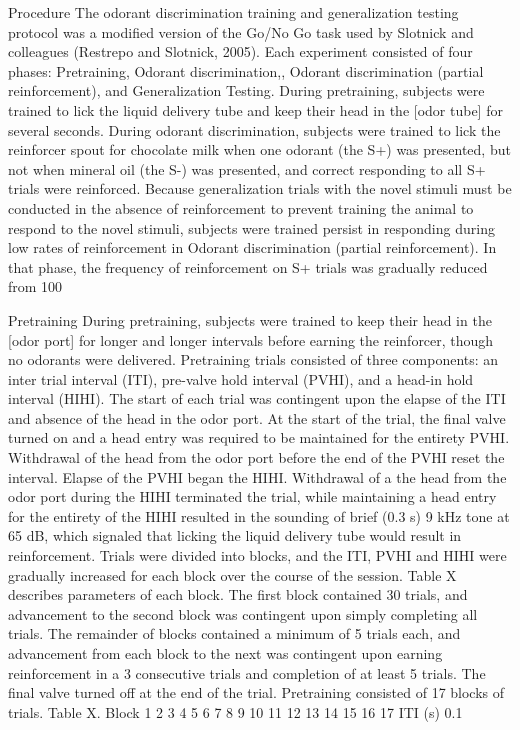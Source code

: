 Procedure
The odorant discrimination training and generalization testing protocol was a modified version of the Go/No Go task used by Slotnick and colleagues (Restrepo and Slotnick, 2005). Each experiment consisted of four phases: Pretraining, Odorant discrimination,, Odorant discrimination (partial reinforcement),  and Generalization Testing. During pretraining, subjects were trained to lick the liquid delivery tube and keep their head in the [odor tube] for several seconds. During odorant discrimination, subjects were trained to lick the reinforcer spout for chocolate milk when one odorant (the S+) was presented, but not when mineral oil (the S-) was presented, and correct responding to all S+ trials were reinforced. Because generalization trials with the novel stimuli must be conducted in the absence of reinforcement to prevent training the animal to respond to the novel stimuli, subjects were trained persist in responding during low rates of reinforcement in Odorant discrimination (partial reinforcement). In that phase, the frequency of reinforcement on S+ trials was gradually reduced from 100%

Pretraining
During pretraining, subjects were trained to keep their head in the [odor port] for longer and longer intervals before earning the reinforcer, though no odorants were delivered. Pretraining trials consisted of three components: an inter trial interval (ITI), pre-valve hold interval (PVHI), and a head-in hold interval (HIHI). The start of each trial was contingent upon the elapse of the ITI and absence of the head in the odor port. At the start of the trial, the final valve turned on and a head entry was required to be maintained for the entirety PVHI. Withdrawal of the head from the odor port before the end of the PVHI reset the interval. Elapse of the PVHI began the HIHI. Withdrawal of a the head from the odor port during the HIHI terminated the trial, while maintaining a head entry for the entirety of the HIHI resulted in the sounding of brief (0.3 s) 9 kHz tone at 65 dB, which signaled that licking the liquid delivery tube would result in reinforcement.
Trials were divided into blocks, and the ITI, PVHI and HIHI were gradually increased for each block over the course of the session. Table X describes parameters of each block. The first block contained 30 trials, and advancement to the second block was contingent upon simply completing all trials. The remainder of blocks contained a minimum of 5 trials each, and advancement from each block to the next was contingent upon earning reinforcement in a 3 consecutive trials and completion of at least 5 trials. The final valve turned off at the end of the trial. Pretraining consisted of 17 blocks of trials.
Table X.
Block
1
2
3
4
5
6
7
8
9
10
11
12
13
14
15
16
17
ITI (s)
0.1
 
